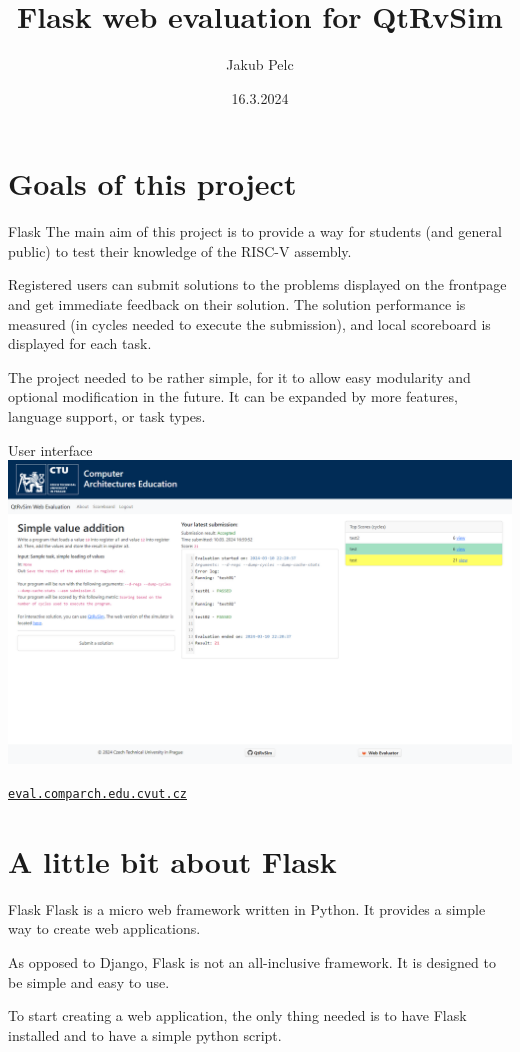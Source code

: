 \documentclass{beamer}
\title{Flask web evaluation for QtRvSim}
\date{16.3.2024}
\author{Jakub Pelc}
\institute{Faculty of Electrical Engineering, Czech Technical University in Prague \par Installfest 2024}
\begin{document}
	\maketitle
	\section{Goals of this project}
	\begin{frame}{Flask}
		The main aim of this project is to provide a way for students (and general public) to test their knowledge of the RISC-V assembly.

		Registered users can submit solutions to the problems displayed on the frontpage and get immediate feedback on their solution.
		The solution performance is measured (in cycles needed to execute the submission), and local scoreboard is displayed for each task.\par

		The project needed to be rather simple, for it to allow easy modularity and optional modification in the future. It can be expanded by
		more features, language support, or task types.
	\end{frame}
	
	\begin{frame}{User interface}
		\centering
		\includegraphics[width=1.0\textwidth]{images/ui.png}

		\href{http://eval.comparch.edu.cvut.cz}{\texttt{eval.comparch.edu.cvut.cz}}
	\end{frame}

	\section{A little bit about Flask}
	
	\begin{frame}{Flask}
		Flask is a micro web framework written in Python. It provides a simple way to create web applications. \par

		As opposed to Django, Flask is not an all-inclusive framework. It is designed to be simple and easy to use. \par

		To start creating a web application, the only thing needed is to have Flask installed and to have a simple python script.
	\end{frame}
\end{document}
